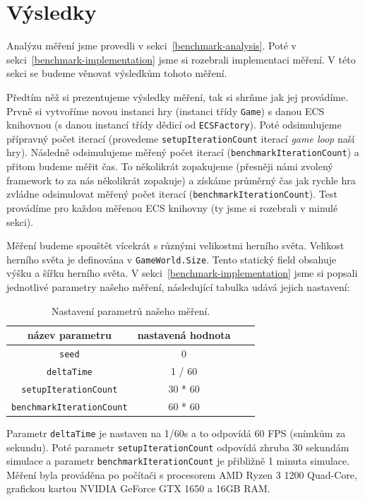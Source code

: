 \section{Výsledky}
\label{sec:benchmark-results}
Analýzu měření jsme provedli v sekci~\ref{benchmark-analysis}. Poté v sekci~\ref{benchmark-implementation} jsme si rozebrali implementaci měření. V této sekci se budeme věnovat výsledkům tohoto měření.

Předtím něž si prezentujeme výsledky měření, tak si shrňme jak jej provádíme. Prvně si vytvoříme novou instanci hry (instanci třídy \texttt{Game}) s danou ECS knihovnou (s danou instancí třídy dědicí od \texttt{ECSFactory}). Poté odsimulujeme přípravný počet iterací (provedeme \texttt{setupIterationCount} iterací \textit{game loop} naší hry). Následně odsimulujeme měřený počet iterací (\texttt{benchmarkIterationCount}) a přitom budeme měřit čas. To několikrát zopakujeme (přesněji námi zvolený framework to za nás několikrát zopakuje) a získáme průměrný čas jak rychle hra zvládne odsimulovat měřený počet iterací (\texttt{benchmarkIterationCount}). Test provádíme pro každou měřenou ECS knihovny (ty jsme si rozebrali v minulé sekci).

Měření budeme spouštět vícekrát s různými velikostmi herního světa. Velikost herního světa je definována v \texttt{GameWorld.Size}. Tento statický field obsahuje výšku a šířku herního světa. V sekci~\ref{benchmark-implementation} jsme si popsali jednotlivé parametry našeho měření, následující tabulka udává jejich nastavení:

\begin{table}[!htb]
    \centering\footnotesize\sf
    \begin{tabular}{c c c c}
        \toprule
        název parametru & nastavená hodnota \\
        \midrule
        \texttt{seed} & 0 \\
        \texttt{deltaTime} & 1 / 60 \\
        \texttt{setupIterationCount} & 30 * 60 \\
        \texttt{benchmarkIterationCount} & 60 * 60 \\
        \bottomrule
    \end{tabular}
    \caption{Nastavení parametrů našeho měření.}
    \label{tab:benchmark-parameters}
\end{table}

Parametr \texttt{deltaTime} je nastaven na 1/60s a to odpovídá 60 FPS (snímkům za sekundu). Poté parametr \texttt{setupIterationCount} odpovídá zhruba 30 sekundám simulace a parametr \texttt{benchmarkIterationCount} je přibližně 1 minuta simulace. Měření byla prováděna po počítači s procesorem AMD Ryzen 3 1200 Quad-Core, grafickou kartou NVIDIA GeForce GTX 1650 a 16GB RAM.

